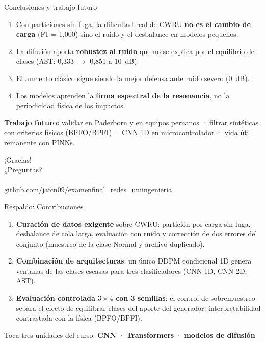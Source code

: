 \documentclass[aspectratio=169,11pt]{beamer}
\begin{document}
\begin{frame}{Conclusiones y trabajo futuro}
\begin{enumerate}
\item Con particiones sin fuga, la dificultad real de CWRU \textbf{no es el cambio de carga} (F1 = 1,000) sino el \alert{ruido} y el desbalance en modelos pequeños.
\item La difusión aporta \textbf{robustez al ruido} que no se explica por el equilibrio de clases (AST: 0,333 $\to$ 0,851 a 10~dB).
\item El aumento clásico sigue siendo la mejor defensa ante ruido severo (0~dB).
\item Los modelos aprenden la \textbf{firma espectral de la resonancia}, no la periodicidad física de los impactos.
\end{enumerate}
\vspace{2mm}
\textbf{Trabajo futuro:} validar en Paderborn y en equipos peruanos · filtrar sintéticas con criterios físicos (BPFO/BPFI) · CNN 1D en microcontrolador · vida útil remanente con PINNs.
\end{frame}

\begin{frame}[standout]
¡Gracias!\\[4mm]
{\normalsize ¿Preguntas?}\\[6mm]
\\[2mm]
{\scriptsize github.com/jafcn09/examenfinal\_redes\_uniingenieria}
\end{frame}

\appendix
\begin{frame}{Respaldo: Contribuciones}
\begin{enumerate}
\item \textbf{Curación de datos exigente} sobre CWRU: partición por carga sin fuga, desbalance de cola larga, evaluación con ruido y \alert{corrección de dos errores del conjunto} (muestreo de la clase Normal y archivo duplicado).
\item \textbf{Combinación de arquitecturas}: un único DDPM condicional 1D genera ventanas de las clases escasas para tres clasificadores (CNN 1D, CNN 2D, AST).
\item \textbf{Evaluación controlada $3\times4$ con 3 semillas}: el \alert{control de sobremuestreo} separa el efecto de equilibrar clases del aporte del generador; interpretabilidad contrastada con la física (BPFO/BPFI).
\end{enumerate}
\vspace{3mm}
\centering\small Toca tres unidades del curso: \textbf{CNN} · \textbf{Transformers} · \textbf{modelos de difusión}
\end{frame}
\end{document}
